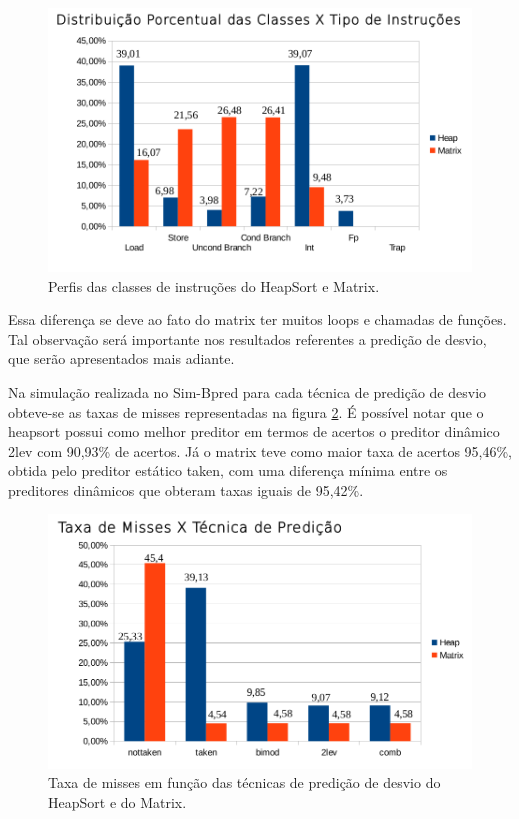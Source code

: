 \documentclass[12pt]{article}
\begin{document}
\begin{figure}[ht]
\centering
\includegraphics[width=.8\textwidth]{graf11.png}
\caption{Perfis das classes de instruções do HeapSort e Matrix.}
\label{fig:classes}
\end{figure}

Essa diferença se deve ao fato do matrix ter muitos loops e chamadas de funções. Tal observação será importante nos resultados referentes a predição de desvio,
que serão apresentados mais adiante.

Na simulação realizada no Sim-Bpred para cada técnica de predição de desvio obteve-se as taxas de misses representadas na figura \ref{fig:sim-bpred}. É possível
notar que o heapsort possui como melhor preditor em termos de acertos o preditor dinâmico 2lev com 90,93\% de acertos. Já o matrix teve como maior taxa de
acertos 95,46\%, obtida pelo preditor estático taken, com uma diferença mínima entre os preditores dinâmicos que obteram taxas iguais de 95,42\%.

\begin{figure}[ht]
\centering
\includegraphics[width=.8\textwidth]{graf22.png}
\caption{Taxa de misses em função das técnicas de predição de desvio do HeapSort e do Matrix.}
\label{fig:sim-bpred}
\end{figure}
\end{document}
